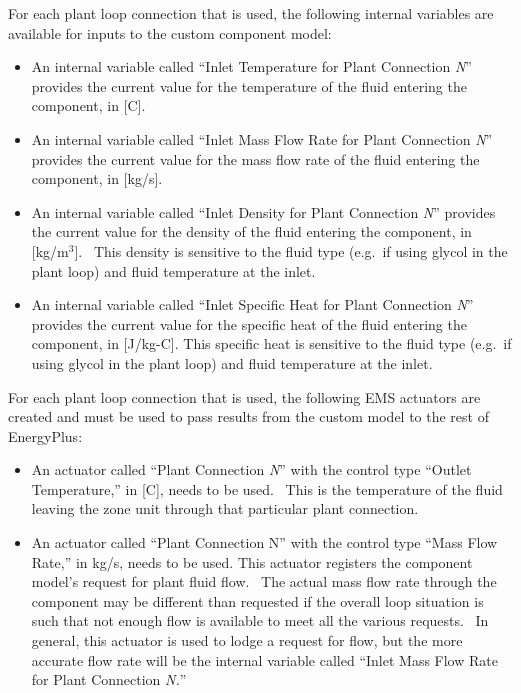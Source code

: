 For each plant loop connection that is used, the following internal variables are available for inputs to the custom component model:

\begin{itemize}
\item
  An internal variable called ``Inlet Temperature for Plant Connection \emph{N}'' provides the current value for the temperature of the fluid entering the component, in {[}C{]}.
\item
  An internal variable called ``Inlet Mass Flow Rate for Plant Connection \emph{N}'' provides the current value for the mass flow rate of the fluid entering the component, in {[}kg/s{]}.
\item
  An internal variable called ``Inlet Density for Plant Connection \emph{N}'' provides the current value for the density of the fluid entering the component, in {[}kg/m\(^{3}\){]}.~ This density is sensitive to the fluid type (e.g.~if using glycol in the plant loop) and fluid temperature at the inlet.
\item
  An internal variable called ``Inlet Specific Heat for Plant Connection \emph{N}'' provides the current value for the specific heat of the fluid entering the component, in {[}J/kg-C{]}. This specific heat is sensitive to the fluid type (e.g.~if using glycol in the plant loop) and fluid temperature at the inlet.
\end{itemize}

For each plant loop connection that is used, the following EMS actuators are created and must be used to pass results from the custom model to the rest of EnergyPlus:

\begin{itemize}
\item
  An actuator called ``Plant Connection \emph{N}'' with the control type ``Outlet Temperature,'' in {[}C{]}, needs to be used.~ This is the temperature of the fluid leaving the zone unit through that particular plant connection.
\item
  An actuator called ``Plant Connection N'' with the control type ``Mass Flow Rate,'' in kg/s, needs to be used. This actuator registers the component model's request for plant fluid flow.~ The actual mass flow rate through the component may be different than requested if the overall loop situation is such that not enough flow is available to meet all the various requests.~ In general, this actuator is used to lodge a request for flow, but the more accurate flow rate will be the internal variable called ``Inlet Mass Flow Rate for Plant Connection \emph{N.}''
\end{itemize}

